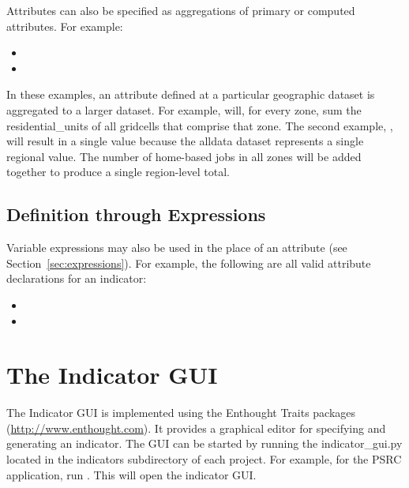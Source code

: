 Attributes can also be specified as aggregations of primary or computed
attributes. For example:

\begin{itemize}
\tight
\item {}
\item {}
\end{itemize}

In these examples, an attribute defined at a particular geographic dataset is
aggregated to a larger dataset. For example,
 will, for
every zone, sum the residential_units of all gridcells that comprise that zone. 
The second example,
, will
result in a single value because the alldata dataset represents a single
regional value. The number of home-based jobs in all zones will be added
together to produce a single region-level total. 

\subsection{Definition through Expressions}

Variable expressions may also be used in the place of an attribute 
(see Section~\ref{sec:expressions}). For example, the following are
all valid attribute declarations for an indicator: 

\begin{itemize}
\tight
\item {}
\item {}
\end{itemize}

\section{The Indicator GUI}
\label{sec:indicator-configuration-gui}

The Indicator GUI is implemented using the Enthought Traits packages
(\url{http://www.enthought.com}).  It provides a graphical editor for
specifying and generating an indicator.  The GUI can be started by running
the indicator_gui.py located in the indicators subdirectory of each
project. For example, for the PSRC application, run
.  This will open the indicator GUI.

